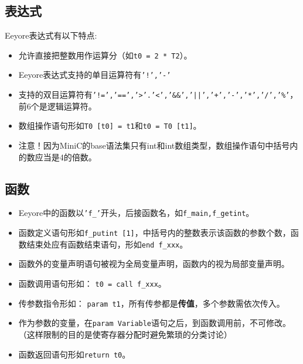 \documentclass{ctexart}
\begin{document}
\subsection{表达式}


Eeyore表达式有以下特点:
\begin{itemize}

\item 
允许直接把整数用作运算分（如\texttt{t0 = 2 * T2}）。

\item
Eeyore表达式支持的单目运算符有\texttt{'!','-'}

\item 
支持的双目运算符有\texttt{'!=','==','\textgreater'.'\textless','\&\&','||','+','-','*','/','\%'}，前6个是逻辑运算符。

\item 
数组操作语句形如\texttt{T0 [t0] = t1}和\texttt{t0 = T0 [t1]}。

\item
注意！因为MiniC的base语法集只有int和int数组类型，数组操作语句中括号内的数应当是4的倍数。

\end{itemize}
\subsection{函数}
\begin{itemize}
\item 
Eeyore中的函数以\texttt{'f\_'}开头，后接函数名，如\texttt{f\_main,f\_getint}。

\item 
函数定义语句形如\texttt{f\_putint [1]}，中括号内的整数表示该函数的参数个数，函数结束处应有函数结束语句，形如\texttt{end f\_xxx}。

\item 
函数外的变量声明语句被视为全局变量声明，函数内的视为局部变量声明。

\item 
函数调用语句形如： \texttt{t0 = call f\_xxx}。

\item 
传参数指令形如： \texttt{param t1}，所有传参都是\textbf{传值}，多个参数需依次传入。

\item
作为参数的变量，在\texttt{param Variable}语句之后，到函数调用前，不可修改。（这样限制的目的是使寄存器分配时避免繁琐的分类讨论）

\item
函数返回语句形如\texttt{return t0}。
\end{itemize}
\end{document}
